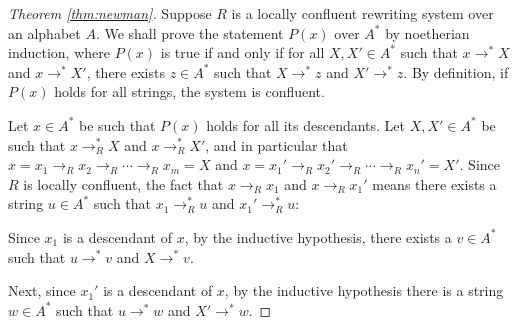 \documentclass[11pt,libertine,widepage,nosubthm]{lmaths}
\begin{document}
\begin{proof}[Theorem \ref{thm:newman}]
	Suppose $R$ is a locally confluent rewriting system over an alphabet $A$. We shall prove the statement $P(x)$ over $A^*$ by noetherian induction, where $P(x)$ is true if and only if for all $X, X' \in A^*$ such that $x \to^* X$ and $x \to^* X'$, there exists $z \in A^*$ such that $X \to^* z$ and $X' \to^* z$. By definition, if $P(x)$ holds for all strings, the system is confluent.

	Let $x \in A^*$ be such that $P(x)$ holds for all its descendants. Let $X, X' \in A^*$ be such that $x \to_R^* X$ and $x \to_R^* X'$, and in particular that $x = x_1 \to_R x_2 \to_R \cdots \to_R x_m = X$ and $x = x_1' \to_R x_2' \to_R \cdots \to_R x_n' = X'$. Since $R$ is locally confluent, the fact that $x \to_R x_1$ and $x \to_R x_1'$ means there exists a string $u \in A^*$ such that $x_1 \to_R^* u$ and $x_1' \to_R^* u$:

	{\centering
	\par}

	Since $x_1$ is a descendant of $x$, by the inductive hypothesis, there exists a $v \in A^*$ such that $u \to^* v$ and $X \to^* v$.

	{\centering
	\par}

	Next, since $x_1'$ is a descendant of $x$, by the inductive hypothesis there is a string $w \in A^*$ such that $u \to^* w$ and $X' \to^* w$.

	{\centering
	\par}


\end{proof}
\end{document}
